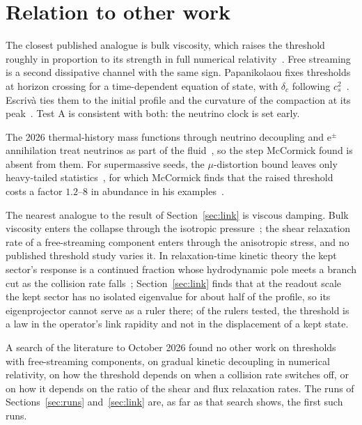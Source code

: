 \documentclass[11pt]{article}
\begin{document}
\section{Relation to other work}

The closest published analogue is bulk viscosity, which raises the threshold roughly in proportion to its strength in full numerical relativity~\cite{Yuwen}. Free streaming is a second dissipative channel with the same sign. Papanikolaou fixes thresholds at horizon crossing for a time-dependent equation of state, with $\delta_c$ following $c_s^2$~\cite{Pap}. Escriv\`a ties them to the initial profile and the curvature of the compaction at its peak~\cite{Esc}. Test A is consistent with both: the neutrino clock is set early.

The 2026 thermal-history mass functions through neutrino decoupling and e$^\pm$ annihilation treat neutrinos as part of the fluid~\cite{Gonin}, so the step McCormick found is absent from them. For supermassive seeds, the $\mu$-distortion bound leaves only heavy-tailed statistics~\cite{Dave}, for which McCormick finds that the raised threshold costs a factor $1.2$--$8$ in abundance in his examples~\cite{McC}.

The nearest analogue to the result of Section~\ref{sec:link} is viscous damping. Bulk viscosity enters the collapse through the isotropic pressure~\cite{Yuwen}; the shear relaxation rate of a free-streaming component enters through the anisotropic stress, and no published threshold study varies it. In relaxation-time kinetic theory the kept sector's response is a continued fraction whose hydrodynamic pole meets a branch cut as the collision rate falls~\cite{Rom,Hu}; Section~\ref{sec:link} finds that at the readout scale the kept sector has no isolated eigenvalue for about half of the profile, so its eigenprojector cannot serve as a ruler there; of the rulers tested, the threshold is a law in the operator's link rapidity and not in the displacement of a kept state.

A search of the literature to October 2026 found no other work on thresholds with free-streaming components, on gradual kinetic decoupling in numerical relativity, on how the threshold depends on when a collision rate switches off, or on how it depends on the ratio of the shear and flux relaxation rates. The runs of Sections~\ref{sec:runs} and~\ref{sec:link} are, as far as that search shows, the first such runs.
\end{document}
